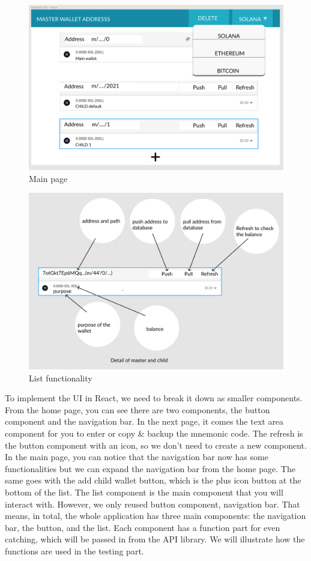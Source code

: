 \begin{figure}[h!]
  \centering
  \includegraphics[width=1\textwidth]{images/component04.png}
  \caption[Main page]{Main page}
  \label{fig:maine_page}
\end{figure}

\begin{figure}[h!]
  \centering
  \includegraphics[width=1\textwidth]{images/component05.png}
  \caption[List functionality]{List functionality}
  \label{fig:list_function}
\end{figure}

To implement the UI in React, we need to break it down as smaller components. From the home page, you can see there are two components, the button component and the navigation bar. In the next page, it comes the text area component for you to enter or copy \& backup the mnemonic code. The refresh is the button component with an icon, so we don't need to create a new component. In the main page, you can notice that the navigation bar now has some functionalities but we can expand the navigation bar from the home page. The same goes with the add child wallet button, which is the plus icon button at the bottom of the list. The list component is the main component that you will interact with. However, we only reused button component, navigation bar. That means, in total, the whole application has three main components: the navigation bar, the button, and the list. Each component has a function part for even catching, which will be passed in from the API library. We will illustrate how the functions are used in the testing part.
